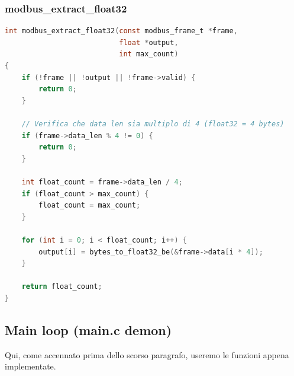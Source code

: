 \subsubsection{modbus_extract_float32}
\begin{lstlisting}[language=C]
int modbus_extract_float32(const modbus_frame_t *frame,
                           float *output,
                           int max_count)
{
    if (!frame || !output || !frame->valid) {
        return 0;
    }

    // Verifica che data len sia multiplo di 4 (float32 = 4 bytes)
    if (frame->data_len % 4 != 0) {
        return 0;
    }

    int float_count = frame->data_len / 4;
    if (float_count > max_count) {
        float_count = max_count;
    }

    for (int i = 0; i < float_count; i++) {
        output[i] = bytes_to_float32_be(&frame->data[i * 4]);
    }

    return float_count;
}
\end{lstlisting}

\subsection{Main loop (main.c demon)}

Qui, come accennato prima dello scorso paragrafo, useremo le funzioni appena implementate.

